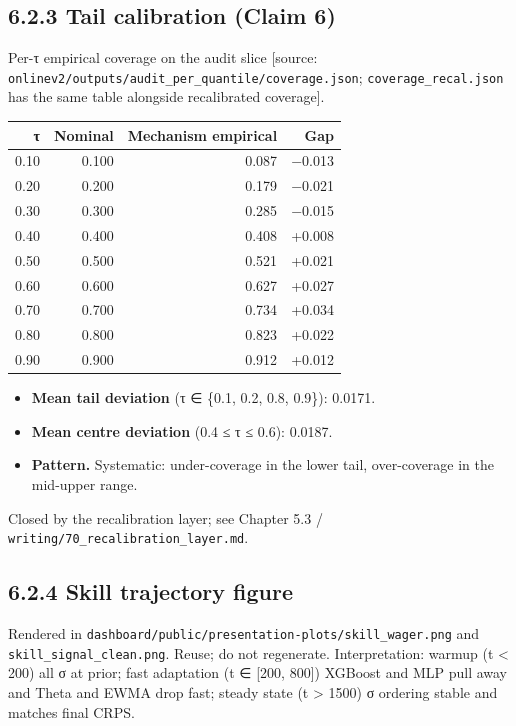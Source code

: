 \documentclass[11pt,a4paper,openany]{report}
\begin{document}
\subsection{6.2.3 Tail calibration (Claim 6)}

Per-τ empirical coverage on the audit slice [source:
\texttt{onlinev2/outputs/audit\_per\_quantile/coverage.json};
\texttt{coverage\_recal.json} has the same table alongside recalibrated
coverage].

\begin{center}
\small
\begin{tabular}{rrrr}
\toprule
\textbf{τ} & \textbf{Nominal} & \textbf{Mechanism empirical} & \textbf{Gap} \\
\midrule
0.10 & 0.100 & 0.087 & −0.013 \\
0.20 & 0.200 & 0.179 & −0.021 \\
0.30 & 0.300 & 0.285 & −0.015 \\
0.40 & 0.400 & 0.408 & +0.008 \\
0.50 & 0.500 & 0.521 & +0.021 \\
0.60 & 0.600 & 0.627 & +0.027 \\
0.70 & 0.700 & 0.734 & +0.034 \\
0.80 & 0.800 & 0.823 & +0.022 \\
0.90 & 0.900 & 0.912 & +0.012 \\
\bottomrule
\end{tabular}
\end{center}

\begin{itemize}
  \item \textbf{Mean tail deviation} (τ ∈ \{0.1, 0.2, 0.8, 0.9\}): 0.0171.
  \item \textbf{Mean centre deviation} (0.4 ≤ τ ≤ 0.6): 0.0187.
  \item \textbf{Pattern.} Systematic: under-coverage in the lower tail,
    over-coverage in the mid-upper range.
\end{itemize}

Closed by the recalibration layer; see Chapter 5.3 /
\texttt{writing/70\_recalibration\_layer.md}.

\subsection{6.2.4 Skill trajectory figure}

Rendered in \texttt{dashboard/public/presentation-plots/skill\_wager.png} and
\texttt{skill\_signal\_clean.png}. Reuse; do not regenerate. Interpretation:
warmup (t < 200) all σ at prior; fast adaptation (t ∈ [200, 800])
XGBoost and MLP pull away and Theta and EWMA drop fast; steady state
(t > 1500) σ ordering stable and matches final CRPS.
\end{document}
